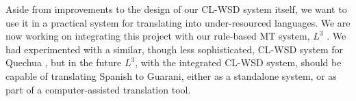 \documentclass[11pt,letterpaper]{article}
\begin{document}
Aside from improvements to the design of our CL-WSD system itself, we want to
use it in a practical system for translating into under-resourced languages.
We are now working on integrating this project with our rule-based MT system,
$L^3$ \cite{gasser:aflat2012}. We had experimented with a similar, though less
sophisticated, CL-WSD system for Quechua \cite{rudnick:2011:RANLPStud}, but in
the future $L^3$, with the integrated CL-WSD system, should be capable of
translating Spanish to Guarani, either as a standalone system, or as part of a
computer-assisted translation tool.



{}
\end{document}
